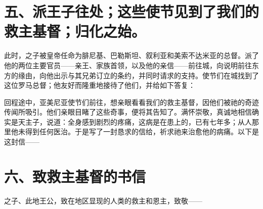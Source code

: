 \section{五、派王子往处；这些使节见到了我们的救主基督；归化之始。}

此时，之子被皇帝任命为腓尼基、巴勒斯坦、叙利亚和美索不达米亚的总督。派了他的两位主要官员——亲王、家族首领，以及他的亲信——前往城，向说明前往东方的缘由，向他出示与其兄弟订立的条约，并同时请求的支持。使节们在城找到了这位罗马总督；他友好而隆重地接待了他们，并给如下答复：\par

回程途中，亚美尼亚使节们前往，想亲眼看看我们的救主基督，因他们被祂的奇迹传闻所吸引。他们亲眼目睹了这些奇事，便将其告知了。满怀崇敬，真诚地相信确实是天主子，说道：全身感到剧烈的疼痛，这病是在患上的，已有七年多；从人那里他未得到任何医治。于是写了一封恳求的信给，祈求祂来治愈他的病痛。以下是这封信——\par


\section{六、致救主基督的书信}

之子、此地王公，致在地区显现的人类的救主和恩主，致敬——\par

\par


